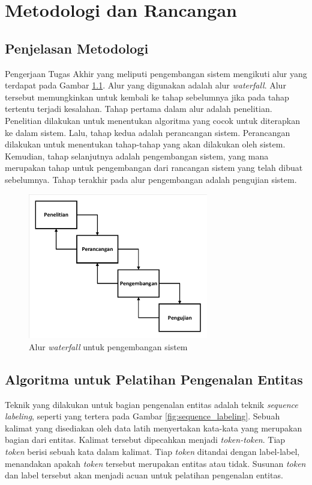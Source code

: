 \chapter{Metodologi dan Rancangan}

\section{Penjelasan Metodologi}

Pengerjaan Tugas Akhir yang meliputi pengembangan sistem mengikuti alur yang terdapat pada Gambar \ref{fig:waterfall}. Alur yang digunakan adalah alur \textit{waterfall}. Alur tersebut memungkinkan untuk kembali ke tahap sebelumnya jika pada tahap tertentu terjadi kesalahan. Tahap pertama dalam alur adalah penelitian. Penelitian dilakukan untuk menentukan algoritma yang cocok untuk diterapkan ke dalam sistem. Lalu, tahap kedua adalah perancangan sistem. Perancangan dilakukan untuk menentukan tahap-tahap yang akan dilakukan oleh sistem. Kemudian, tahap selanjutnya adalah pengembangan sistem, yang mana merupakan tahap untuk pengembangan dari rancangan sistem yang telah dibuat sebelumnya. Tahap terakhir pada alur pengembangan adalah pengujian sistem.

\begin{figure}[H]
	\centering
	\includegraphics[width=0.7\textwidth, trim=2 2 2 2, clip]{resources/3/waterfall.pdf}
	\caption{Alur \textit{waterfall} untuk pengembangan sistem}
	\label{fig:waterfall}
\end{figure}

\section{Algoritma untuk Pelatihan Pengenalan Entitas}

Teknik yang dilakukan untuk bagian pengenalan entitas adalah teknik \textit{sequence labeling}, seperti yang tertera pada Gambar \ref{fig:sequence_labeling}. Sebuah kalimat yang disediakan oleh data latih menyertakan kata-kata yang merupakan bagian dari entitas. Kalimat tersebut dipecahkan menjadi \textit{token-token}. Tiap \textit{token} berisi sebuah kata dalam kalimat. Tiap \textit{token} ditandai dengan label-label, menandakan apakah \textit{token} tersebut merupakan entitas atau tidak. Susunan \textit{token} dan label tersebut akan menjadi acuan untuk pelatihan pengenalan entitas.

